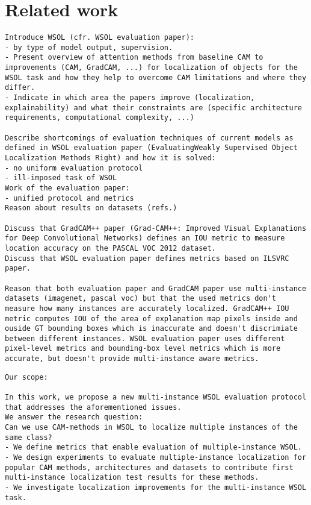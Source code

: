 \chapter{Related work}


\begin{verbatim}
Introduce WSOL (cfr. WSOL evaluation paper):
- by type of model output, supervision.
- Present overview of attention methods from baseline CAM to improvements (CAM, GradCAM, ...) for localization of objects for the WSOL task and how they help to overcome CAM limitations and where they differ.
- Indicate in which area the papers improve (localization, explainability) and what their constraints are (specific architecture requirements, computational complexity, ...)

Describe shortcomings of evaluation techniques of current models as defined in WSOL evaluation paper (EvaluatingWeakly Supervised Object Localization Methods Right) and how it is solved:
- no uniform evaluation protocol
- ill-imposed task of WSOL
Work of the evaluation paper: 
- unified protocol and metrics 
Reason about results on datasets (refs.)

Discuss that GradCAM++ paper (Grad-CAM++: Improved Visual Explanations for Deep Convolutional Networks) defines an IOU metric to measure location accuracy on the PASCAL VOC 2012 dataset.
Discuss that WSOL evaluation paper defines metrics based on ILSVRC paper.

Reason that both evaluation paper and GradCAM paper use multi-instance datasets (imagenet, pascal voc) but that the used metrics don't measure how many instances are accurately localized. GradCAM++ IOU metric computes IOU of the area of explanation map pixels inside and ouside GT bounding boxes which is inaccurate and doesn't discrimiate between different instances. WSOL evaluation paper uses different pixel-level metrics and bounding-box level metrics which is more accurate, but doesn't provide multi-instance aware metrics.
\end{verbatim}

\begin{verbatim}
Our scope:

In this work, we propose a new multi-instance WSOL evaluation protocol that addresses the aforementioned issues. 
We answer the research question:
Can we use CAM-methods in WSOL to localize multiple instances of the same class?
- We define metrics that enable evaluation of multiple-instance WSOL.
- We design experiments to evaluate multiple-instance localization for popular CAM methods, architectures and datasets to contribute first multi-instance localization test results for these methods.
- We investigate localization improvements for the multi-instance WSOL task.
\end{verbatim}